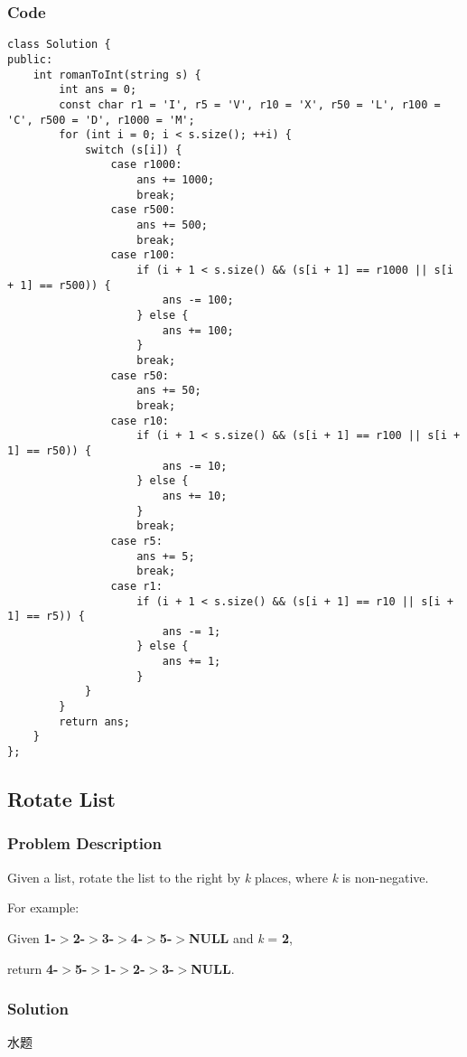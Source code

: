 \documentclass[courier]{article}
\begin{document}
\begin{CJK*}{UTF8}{gkai}
\subsubsection*{Code}
\begin{lstlisting}
class Solution {
public:
    int romanToInt(string s) {
        int ans = 0;
        const char r1 = 'I', r5 = 'V', r10 = 'X', r50 = 'L', r100 = 'C', r500 = 'D', r1000 = 'M';
        for (int i = 0; i < s.size(); ++i) {
            switch (s[i]) {
                case r1000:
                    ans += 1000;
                    break;
                case r500:
                    ans += 500;
                    break;
                case r100:
                    if (i + 1 < s.size() && (s[i + 1] == r1000 || s[i + 1] == r500)) {
                        ans -= 100;
                    } else {
                        ans += 100;
                    }
                    break;
                case r50:
                    ans += 50;
                    break;
                case r10:
                    if (i + 1 < s.size() && (s[i + 1] == r100 || s[i + 1] == r50)) {
                        ans -= 10;
                    } else {
                        ans += 10;
                    }
                    break;
                case r5:
                    ans += 5;
                    break;
                case r1:
                    if (i + 1 < s.size() && (s[i + 1] == r10 || s[i + 1] == r5)) {
                        ans -= 1;
                    } else {
                        ans += 1;
                    }
            }
        }
        return ans;
    }
}; 
\end{lstlisting}


\subsection{ Rotate List }

\subsubsection*{Problem Description}
Given a list, rotate the list to the right by \emph{k} places, where \emph{k} is non-negative.

For example:


Given \textbf{1-$>$2-$>$3-$>$4-$>$5-$>$NULL} and \emph{k} = \textbf{2},


return \textbf{4-$>$5-$>$1-$>$2-$>$3-$>$NULL}.



\subsubsection*{Solution}
水题


\end{CJK*}
\end{document}
